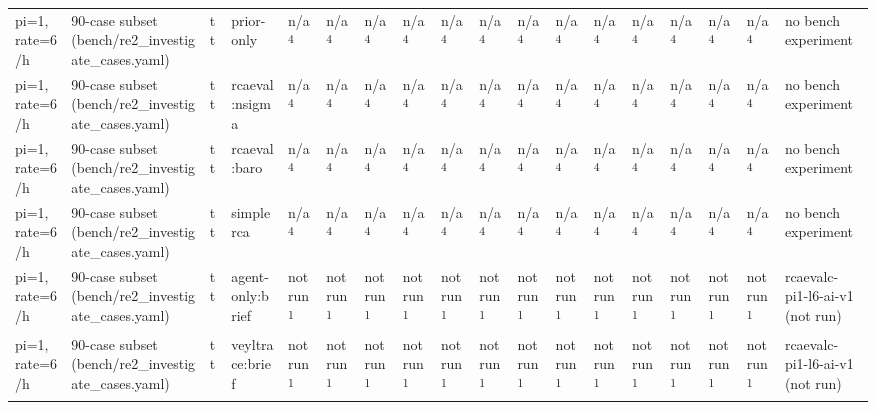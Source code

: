 \begin{table}[t]
\begin{tabular}{llllllllllllllllll}
pi=1, rate=6/h & 90-case subset (bench/re2\_investigate\_cases.yaml) & tt & prior-only & n/a\textsuperscript{4} & n/a\textsuperscript{4} & n/a\textsuperscript{4} & n/a\textsuperscript{4} & n/a\textsuperscript{4} & n/a\textsuperscript{4} & n/a\textsuperscript{4} & n/a\textsuperscript{4} & n/a\textsuperscript{4} & n/a\textsuperscript{4} & n/a\textsuperscript{4} & n/a\textsuperscript{4} & n/a\textsuperscript{4} & no bench experiment \\
pi=1, rate=6/h & 90-case subset (bench/re2\_investigate\_cases.yaml) & tt & rcaeval:nsigma & n/a\textsuperscript{4} & n/a\textsuperscript{4} & n/a\textsuperscript{4} & n/a\textsuperscript{4} & n/a\textsuperscript{4} & n/a\textsuperscript{4} & n/a\textsuperscript{4} & n/a\textsuperscript{4} & n/a\textsuperscript{4} & n/a\textsuperscript{4} & n/a\textsuperscript{4} & n/a\textsuperscript{4} & n/a\textsuperscript{4} & no bench experiment \\
pi=1, rate=6/h & 90-case subset (bench/re2\_investigate\_cases.yaml) & tt & rcaeval:baro & n/a\textsuperscript{4} & n/a\textsuperscript{4} & n/a\textsuperscript{4} & n/a\textsuperscript{4} & n/a\textsuperscript{4} & n/a\textsuperscript{4} & n/a\textsuperscript{4} & n/a\textsuperscript{4} & n/a\textsuperscript{4} & n/a\textsuperscript{4} & n/a\textsuperscript{4} & n/a\textsuperscript{4} & n/a\textsuperscript{4} & no bench experiment \\
pi=1, rate=6/h & 90-case subset (bench/re2\_investigate\_cases.yaml) & tt & simplerca & n/a\textsuperscript{4} & n/a\textsuperscript{4} & n/a\textsuperscript{4} & n/a\textsuperscript{4} & n/a\textsuperscript{4} & n/a\textsuperscript{4} & n/a\textsuperscript{4} & n/a\textsuperscript{4} & n/a\textsuperscript{4} & n/a\textsuperscript{4} & n/a\textsuperscript{4} & n/a\textsuperscript{4} & n/a\textsuperscript{4} & no bench experiment \\
pi=1, rate=6/h & 90-case subset (bench/re2\_investigate\_cases.yaml) & tt & agent-only:brief & not run\textsuperscript{1} & not run\textsuperscript{1} & not run\textsuperscript{1} & not run\textsuperscript{1} & not run\textsuperscript{1} & not run\textsuperscript{1} & not run\textsuperscript{1} & not run\textsuperscript{1} & not run\textsuperscript{1} & not run\textsuperscript{1} & not run\textsuperscript{1} & not run\textsuperscript{1} & not run\textsuperscript{1} & rcaevalc-pi1-l6-ai-v1 (not run) \\
pi=1, rate=6/h & 90-case subset (bench/re2\_investigate\_cases.yaml) & tt & veyltrace:brief & not run\textsuperscript{1} & not run\textsuperscript{1} & not run\textsuperscript{1} & not run\textsuperscript{1} & not run\textsuperscript{1} & not run\textsuperscript{1} & not run\textsuperscript{1} & not run\textsuperscript{1} & not run\textsuperscript{1} & not run\textsuperscript{1} & not run\textsuperscript{1} & not run\textsuperscript{1} & not run\textsuperscript{1} & rcaevalc-pi1-l6-ai-v1 (not run) \\

\end{tabular}
\end{table}
